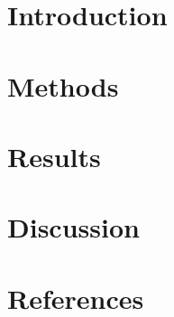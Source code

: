 \documentclass[11pt,onecolumn]{article}
\begin{document}

\section{Introduction}


\section{Methods}


\section{Results}


\section{Discussion}



\section{References}



\end{document}
